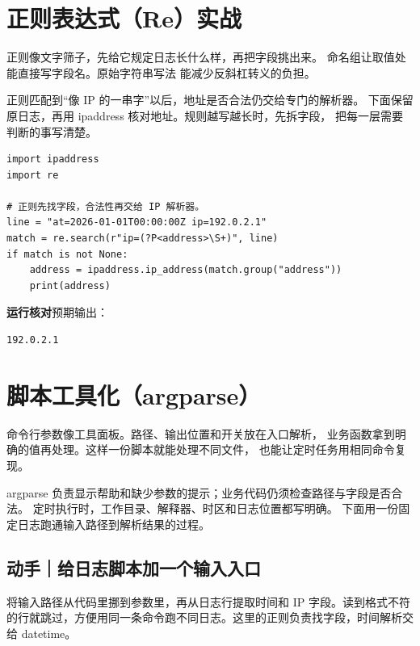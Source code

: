 \par


\section[正则表达式实战]{正则表达式（Re）实战}

正则像文字筛子，先给它规定日志长什么样，再把字段挑出来。
命名组让取值处能直接写字段名。原始字符串写法  能减少反斜杠转义的负担。

正则匹配到“像 IP 的一串字”以后，地址是否合法仍交给专门的解析器。
下面保留原日志，再用 ipaddress 核对地址。规则越写越长时，先拆字段，
把每一层需要判断的事写清楚。


\begin{lstlisting}[title={\code{parse_address.py}}]
import ipaddress
import re

# 正则先找字段，合法性再交给 IP 解析器。
line = "at=2026-01-01T00:00:00Z ip=192.0.2.1"
match = re.search(r"ip=(?P<address>\S+)", line)
if match is not None:
    address = ipaddress.ip_address(match.group("address"))
    print(address)
\end{lstlisting}


\textbf{运行核对}\enspace 预期输出：
\begin{lstlisting}[language={},numbers=none]
192.0.2.1
\end{lstlisting}

\par


\section[脚本工具化]{脚本工具化（argparse）}

命令行参数像工具面板。路径、输出位置和开关放在入口解析，
业务函数拿到明确的值再处理。这样一份脚本就能处理不同文件，
也能让定时任务用相同命令复现。

argparse 负责显示帮助和缺少参数的提示；业务代码仍须检查路径与字段是否合法。
定时执行时，工作目录、解释器、时区和日志位置都写明确。
下面用一份固定日志跑通输入路径到解析结果的过程。

\subsection*{动手｜给日志脚本加一个输入入口}

将输入路径从代码里挪到参数里，再从日志行提取时间和 IP 字段。读到格式不符的行就跳过，方便用同一条命令跑不同日志。这里的正则负责找字段，时间解析交给 datetime。

